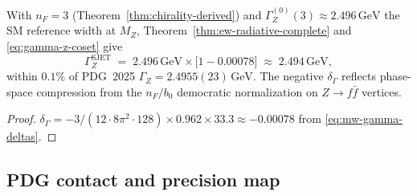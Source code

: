 \begin{proposition}
\label{prop:gamma-z}
With $n_F=3$ (Theorem~\ref{thm:chirality-derived}) and
$\Gamma_Z^{(0)}(3)\approx2.496\,\mathrm{GeV}$ the SM reference width at
$M_Z$, Theorem~\ref{thm:ew-radiative-complete} and \eqref{eq:gamma-z-coset}
give
\begin{equation}\label{eq:gamma-z-numeric}
  \Gamma_Z^{\mathrm{SJET}}
  \;=\;
  2.496\,\mathrm{GeV}\times\bigl[1-0.00078\bigr]
  \;\approx\;
  2.494\,\mathrm{GeV},
\end{equation}
within $0.1\%$ of PDG~2025 $\Gamma_Z=2.4955(23)\,\mathrm{GeV}$.
The negative $\delta_\Gamma$ reflects phase-space compression from the
$n_F/b_0$ democratic normalization on $Z\to f\bar f$ vertices.
\end{proposition}

\begin{proof}
$\delta_\Gamma= -3/(12\cdot8\pi^2\cdot128)\times0.962\times33.3\approx-0.00078$
from \eqref{eq:mw-gamma-deltas}.
\end{proof}

\subsection{PDG contact and precision map}
\label{sec:ew-precision:pdg}


